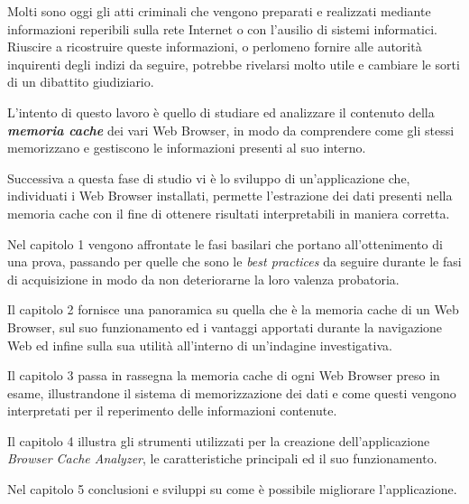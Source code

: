 Molti sono oggi gli atti criminali che vengono preparati e realizzati mediante informazioni reperibili sulla rete Internet o con l'ausilio di sistemi informatici. Riuscire a ricostruire queste informazioni, o perlomeno fornire alle autorità inquirenti degli indizi da seguire, potrebbe rivelarsi molto utile e cambiare le sorti di un dibattito giudiziario.

L'intento di questo lavoro è quello di studiare ed analizzare il contenuto della \textbf{\textit{memoria cache}} dei vari Web Browser, in modo da comprendere come gli stessi memorizzano e gestiscono le informazioni presenti al suo interno. 

Successiva a questa fase di studio vi è lo sviluppo di un'applicazione che, individuati i Web Browser installati, permette l'estrazione dei dati presenti nella memoria cache con il fine di ottenere risultati interpretabili in maniera corretta.

Nel capitolo 1 vengono affrontate le fasi basilari che portano all'ottenimento di una prova, passando per quelle che sono le \textit{best practices} da seguire durante le fasi di acquisizione in modo da non deteriorarne la loro valenza probatoria. 

Il capitolo 2 fornisce una panoramica su quella che è la memoria cache di un Web Browser, sul suo funzionamento ed i vantaggi apportati durante la navigazione Web ed infine sulla sua utilità all'interno di un'indagine investigativa. 
\clearpage

Il capitolo 3 passa in rassegna la memoria cache di ogni Web Browser preso in esame, illustrandone il sistema di memorizzazione dei dati e come questi vengono interpretati per il reperimento delle informazioni contenute.

Il capitolo 4 illustra gli strumenti utilizzati per la creazione dell'applicazione \textit{Browser Cache Analyzer}, le caratteristiche principali ed il suo funzionamento.

Nel capitolo 5 conclusioni e sviluppi su come è possibile migliorare l'applicazione. 


